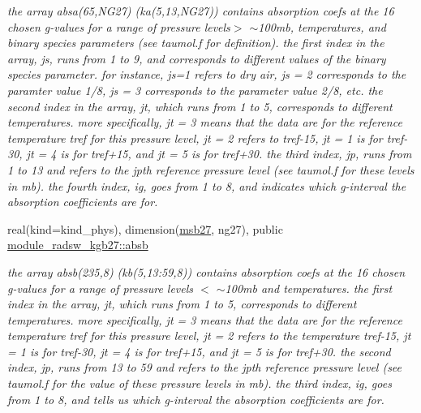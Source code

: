 \begin{DoxyCompactItemize}
\begin{DoxyCompactList}\small\item\em the array absa(65,\+N\+G27) (ka(5,13,\+N\+G27)) contains absorption coefs at the 16 chosen g-\/values for a range of pressure levels$>$ $\sim$100mb, temperatures, and binary species parameters (see taumol.\+f for definition). the first index in the array, js, runs from 1 to 9, and corresponds to different values of the binary species parameter. for instance, js=1 refers to dry air, js = 2 corresponds to the paramter value 1/8, js = 3 corresponds to the parameter value 2/8, etc. the second index in the array, jt, which runs from 1 to 5, corresponds to different temperatures. more specifically, jt = 3 means that the data are for the reference temperature tref for this pressure level, jt = 2 refers to tref-\/15, jt = 1 is for tref-\/30, jt = 4 is for tref+15, and jt = 5 is for tref+30. the third index, jp, runs from 1 to 13 and refers to the jpth reference pressure level (see taumol.\+f for these levels in mb). the fourth index, ig, goes from 1 to 8, and indicates which g-\/interval the absorption coefficients are for. \end{DoxyCompactList}\item 
\mbox{\label{group__module__radsw__kgbnn_ga8edb349c908e6950e0d18f293dd1b6ea}} 
real(kind=kind\+\_\+phys), dimension(\hyperlink{group__module__radsw__kgbnn_ga3b2e57a0d4596aead5cad5aaca74850d}{msb27}, ng27), public \hyperlink{group__module__radsw__kgbnn_ga8edb349c908e6950e0d18f293dd1b6ea}{module\+\_\+radsw\+\_\+kgb27\+::absb}
\begin{DoxyCompactList}\small\item\em the array absb(235,8) (kb(5,13\+:59,8)) contains absorption coefs at the 16 chosen g-\/values for a range of pressure levels $<$ $\sim$100mb and temperatures. the first index in the array, jt, which runs from 1 to 5, corresponds to different temperatures. more specifically, jt = 3 means that the data are for the reference temperature tref for this pressure level, jt = 2 refers to the temperature tref-\/15, jt = 1 is for tref-\/30, jt = 4 is for tref+15, and jt = 5 is for tref+30. the second index, jp, runs from 13 to 59 and refers to the jpth reference pressure level (see taumol.\+f for the value of these pressure levels in mb). the third index, ig, goes from 1 to 8, and tells us which g-\/interval the absorption coefficients are for. \end{DoxyCompactList}\item 

\end{DoxyCompactItemize}

